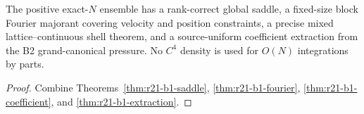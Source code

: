 \begin{theorem}
\label{thm:r21-b1-main}
The positive exact-$N$ ensemble has a rank-correct global saddle, a fixed-size
block Fourier majorant covering velocity and position constraints, a precise
mixed lattice--continuous shell theorem, and a source-uniform coefficient
extraction from the B2 grand-canonical pressure.  No $C^4$ density is used for
$O(N)$ integrations by parts.
\end{theorem}

\begin{proof}
Combine Theorems~\ref{thm:r21-b1-saddle},
\ref{thm:r21-b1-fourier}, \ref{thm:r21-b1-coefficient}, and
\ref{thm:r21-b1-extraction}.
\end{proof}
